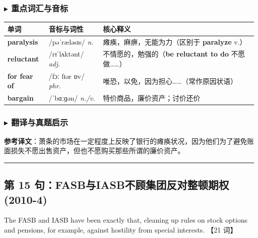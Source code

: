 \documentclass[cn,normal,11pt]{elegantnote}
\newcommand{\retrokey}[1]{{\color{accentcolor}\textbf{#1}}}
\renewcommand{\citshape}{\kaishu\fontspec{Arial}}
\begin{document}
\subsubsection*{$\blacktriangleright$ 重点词汇与音标}
\noindent
\begin{tabularx}{\textwidth}{l X p{7cm}}
  \toprule
  \textbf{单词} & \textbf{音标与词性} & \textbf{核心释义} \\
  \midrule
  \retrokey{paralysis} & {\citshape /pəˈræləsɪs/} \textit{n.} & 瘫痪，麻痹，无能为力（区别于 \textbf{paralyze} v.） \\
  \midrule
  \retrokey{reluctant} & {\citshape /rɪˈlʌktənt/} \textit{adj.} & 不情愿的，勉强的（\textbf{be reluctant to do} 不愿做……） \\
  \midrule
  \retrokey{for fear of} & {\citshape /fɔː fɪər ɒv/} \textit{phr.} & 唯恐，以免，因为担心……（常作原因状语） \\
  \midrule
  \retrokey{bargain} & {\citshape /ˈbɑːɡən/} \textit{n./v.} & 特价商品，廉价资产；讨价还价 \\
  \bottomrule
\end{tabularx}

\subsubsection*{$\blacktriangleright$ 翻译与真题启示}
\begin{remark}
  \textbf{参考译文}：萧条的市场在一定程度上反映了银行的瘫痪状况，因为他们为了避免账面损失不愿出售资产，但也不愿购买那些所谓的廉价资产。
\end{remark}

\par\vspace{10pt}\hrule\vspace{10pt}

\subsection{第 15 句：FASB与IASB不顾集团反对整顿期权 (2010-4)}

\begin{note}
  The FASB and IASB have been exactly that, cleaning up rules on stock options and pensions, for example, against hostility from special interests. 【21 词】
\end{note}
\end{document}
